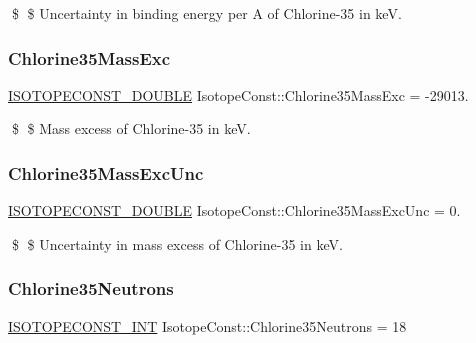 \$ \$ Uncertainty in binding energy per A of Chlorine-\/35 in keV. \mbox{\label{group___isotope_const-_chlorine-_cl35_gaf7dba8f5fb87a63221a24ac5cb380e32}} 
\subsubsection{\texorpdfstring{Chlorine35\+Mass\+Exc}{Chlorine35MassExc}}
{\footnotesize\ttfamily \mbox{\hyperlink{group___isotope_const-_macros_ga8f45a7272ce02c0b4c65c44636ed719a}{I\+S\+O\+T\+O\+P\+E\+C\+O\+N\+S\+T\+\_\+\+D\+O\+U\+B\+LE}} Isotope\+Const\+::\+Chlorine35\+Mass\+Exc = -\/29013.}

\$ \$ Mass excess of Chlorine-\/35 in keV. \mbox{\label{group___isotope_const-_chlorine-_cl35_ga60992e5b94184684487ed04376a723c5}} 
\subsubsection{\texorpdfstring{Chlorine35\+Mass\+Exc\+Unc}{Chlorine35MassExcUnc}}
{\footnotesize\ttfamily \mbox{\hyperlink{group___isotope_const-_macros_ga8f45a7272ce02c0b4c65c44636ed719a}{I\+S\+O\+T\+O\+P\+E\+C\+O\+N\+S\+T\+\_\+\+D\+O\+U\+B\+LE}} Isotope\+Const\+::\+Chlorine35\+Mass\+Exc\+Unc = 0.}

\$ \$ Uncertainty in mass excess of Chlorine-\/35 in keV. \mbox{\label{group___isotope_const-_chlorine-_cl35_gacc4ba22547d5bd2c27dbb317c8ee1c53}} 
\subsubsection{\texorpdfstring{Chlorine35\+Neutrons}{Chlorine35Neutrons}}
{\footnotesize\ttfamily \mbox{\hyperlink{group___isotope_const-_macros_ga5f18360b3e99483a35c32d789e62621c}{I\+S\+O\+T\+O\+P\+E\+C\+O\+N\+S\+T\+\_\+\+I\+NT}} Isotope\+Const\+::\+Chlorine35\+Neutrons = 18}

